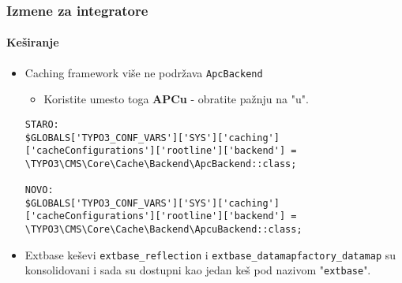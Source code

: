 \begin{frame}[fragile]
	\frametitle{Izmene za integratore}
	\framesubtitle{Keširanje}

	\lstset{basicstyle=\tiny\ttfamily}

	\begin{itemize}
		\item Caching framework više ne podržava \texttt{ApcBackend}

			\begin{itemize}\smaller
				\item[\ding{228}] Koristite umesto toga \textbf{APCu} - obratite pažnju na "u".
			\end{itemize}

\begin{lstlisting}
STARO:
$GLOBALS['TYPO3_CONF_VARS']['SYS']['caching']['cacheConfigurations']['rootline']['backend'] =
\TYPO3\CMS\Core\Cache\Backend\ApcBackend::class;

NOVO:
$GLOBALS['TYPO3_CONF_VARS']['SYS']['caching']['cacheConfigurations']['rootline']['backend'] =
\TYPO3\CMS\Core\Cache\Backend\ApcuBackend::class;
\end{lstlisting}

		\item Extbase keševi \texttt{extbase\_reflection} i \texttt{extbase\_datamapfactory\_datamap}
			su konsolidovani i sada su dostupni kao jedan keš pod nazivom "\texttt{extbase}".

	\end{itemize}

\end{frame}


